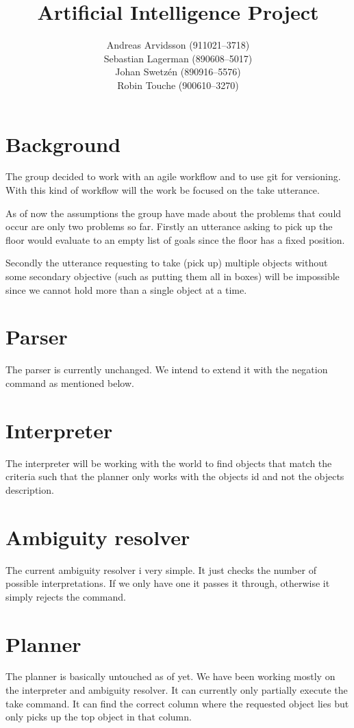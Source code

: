 \documentclass[a4paper]{article}
\title{Artificial Intelligence Project}
\date{}
\author{Andreas Arvidsson (911021--3718) \\
        Sebastian Lagerman (890608--5017) \\
        Johan Swetz\'{e}n (890916--5576) \\
        Robin Touche (900610--3270)}
\begin{document}
\maketitle

\section*{Background}
The group decided to work with an agile workflow and to use git for versioning.
With this kind of workflow will the work be focused on the take utterance.

As of now the assumptions the group have made about the problems that could
occur are only two problems so far. Firstly an utterance asking to pick up the
floor would evaluate to an empty list of goals since the floor has a fixed
position.

Secondly the utterance requesting to take (pick up) multiple objects
without some secondary objective (such as putting them all in boxes) will be
impossible since we cannot hold more than a single object at a time.

\section*{Parser}
The parser is currently unchanged. We intend to extend it with the negation
command as mentioned below.

\section*{Interpreter}
The interpreter will be working with the world to find objects that match the
criteria such that the planner only works with the objects id and not the
objects description.

\section*{Ambiguity resolver}
The current ambiguity resolver i very simple. It just checks the number of
possible interpretations. If we only have one it passes it through, otherwise
it simply rejects the command.

\section*{Planner}
The planner is basically untouched as of yet. We have been working mostly on
the interpreter and ambiguity resolver. It can currently only partially execute
the take command. It can find the correct column where the requested object
lies but only picks up the top object in that column.
\end{document}
